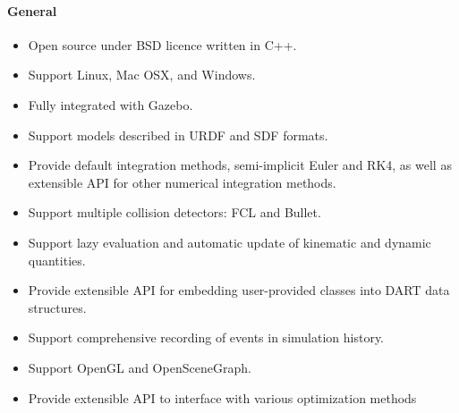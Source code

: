 \paragraph{General}
\begin{itemize}[leftmargin=*] \itemsep1pt \parskip0pt 
  \item Open source under BSD licence written in C++.
  \item Support Linux, Mac OSX, and Windows.
  \item Fully integrated with Gazebo.
  \item Support models described in URDF and SDF formats.
  \item Provide default integration methods, semi-implicit Euler and RK4, as well as extensible API for other numerical integration methods.
  \item Support multiple collision detectors: FCL and Bullet.
  \item Support lazy evaluation and automatic update of kinematic and dynamic quantities.
  \item Provide extensible API for embedding user-provided classes into DART data structures.
  \item Support comprehensive recording of events in simulation history.
  \item Support OpenGL and OpenSceneGraph.
  \item Provide extensible API to interface with various optimization methods
\end{itemize}





